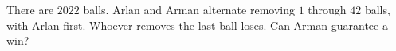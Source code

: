 There are $2022$ balls. Arlan and Arman alternate removing $1$ through $42$ balls, with Arlan first. Whoever removes the last ball loses. Can Arman guarantee a win?
